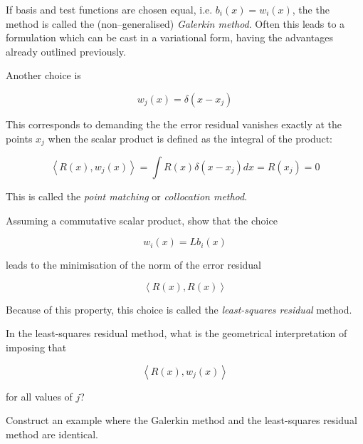 If basis and test functions are chosen equal, i.e. $b_i(x) = w_i(x)$, the the method is called the (non--generalised) \emph{Galerkin method}. Often this leads to a formulation which can be cast in a variational form, having the advantages already outlined previously.

Another choice is

\begin{equation}
w_j(x) = \delta(x-x_j)
\end{equation} 

This corresponds to demanding the the error residual vanishes exactly at the points $x_j$ when the scalar product is defined as the integral of the product:

\begin{equation}
\left\langle R(x), w_j(x) \right\rangle = \int R(x) \delta(x-x_j) dx = R(x_j) = 0
\end{equation} 

This is called the \emph{point matching} or \emph{collocation method}.

\begin{sidebar}
\begin{ex}
Assuming a commutative scalar product, show that the choice 

$$w_i(x) = L b_i(x)$$

leads to the minimisation of the norm of the error residual 

$$\left\langle R(x), R(x) \right\rangle$$ 

Because of this property, this choice is called the \emph{least-squares residual} method.
\end{ex}
\end{sidebar}

\begin{sidebar}
\begin{ex}
In the least-squares residual method, what is the geometrical interpretation of imposing that 

$$\left\langle R(x), w_j(x) \right\rangle$$ 

for all values of $j$?
\end{ex}
\end{sidebar}

\begin{sidebar}
\begin{ex}
Construct an example where the Galerkin method and the least-squares residual method are identical.
\end{ex}
\end{sidebar}

